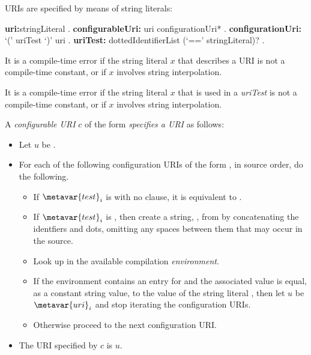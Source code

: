 \documentclass{article}
\begin{document}
\LMHash{}
URIs are specified by means of string literals:

\begin{grammar}
{\bf uri:}stringLiteral
  .
{\bf configurableUri:} uri configurationUri*
  .
{\bf configurationUri:} \IF{} `(' uriTest `)' uri
  .
{\bf uriTest:} dottedIdentifierList (`==' stringLiteral)?
  .
\end{grammar}

\LMHash{}
It is a compile-time error if the string literal $x$ that describes a URI is not a compile-time constant, or if $x$ involves string interpolation.

\LMHash{}
It is a compile-time error if the string literal $x$ that is used in a {\em uriTest} is not a compile-time constant, or if $x$ involves string interpolation.

\LMHash{} A {\em configurable URI} $c$ of the form  {\em specifies a URI} as follows:
\begin{itemize}
\item{} Let $u$ be .
\item{} For each of the following configuration URIs of the form , in source order, do the following.
\begin{itemize}
  \item{} If $\metavar{test}_i$ is  with no \code{==} clause, it is
  equivalent to .
  \item{} If $\metavar{test}_i$ is ,
  then create a string, , from 
  by concatenating the identfiers and dots,
  omitting any spaces between them that may occur in the source.
  \item{} Look up  in the available compilation {\em environment}.
  \item{} If the environment contains an entry for  and the
  associated value is equal, as a constant string value, to the value of
  the string literal ,
  then let $u$ be $\metavar{uri}_i$ and stop iterating the configuration URIs.
  \item{} Otherwise proceed to the next configuration URI.
\end{itemize}
\item{} The URI specified by $c$ is $u$.
\end{itemize}
\end{document}
